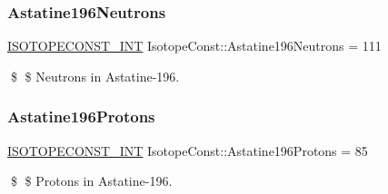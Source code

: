 \subsubsection{\texorpdfstring{Astatine196\+Neutrons}{Astatine196Neutrons}}
{\footnotesize\ttfamily \mbox{\hyperlink{group___isotope_const-_macros_ga5f18360b3e99483a35c32d789e62621c}{I\+S\+O\+T\+O\+P\+E\+C\+O\+N\+S\+T\+\_\+\+I\+NT}} Isotope\+Const\+::\+Astatine196\+Neutrons = 111}

\$ \$ Neutrons in Astatine-\/196. \mbox{\label{group___isotope_const-_astatine-_at196_ga991771f83f218cdcaa05b3329ac3e4be}} 
\subsubsection{\texorpdfstring{Astatine196\+Protons}{Astatine196Protons}}
{\footnotesize\ttfamily \mbox{\hyperlink{group___isotope_const-_macros_ga5f18360b3e99483a35c32d789e62621c}{I\+S\+O\+T\+O\+P\+E\+C\+O\+N\+S\+T\+\_\+\+I\+NT}} Isotope\+Const\+::\+Astatine196\+Protons = 85}

\$ \$ Protons in Astatine-\/196. 